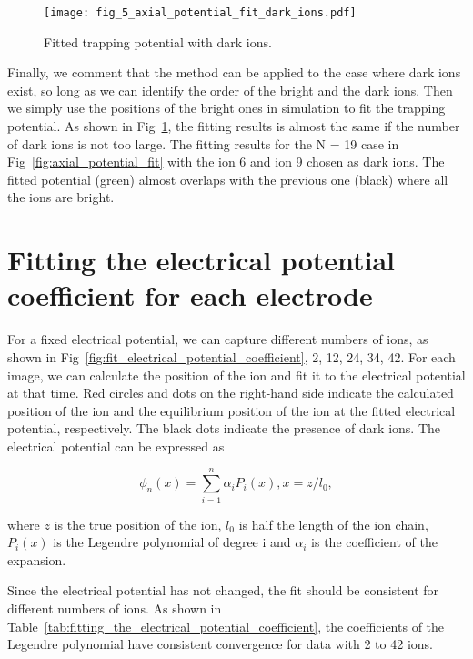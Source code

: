 \begin{figure}
    \centering
    \texttt{[image: fig\_5\_axial\_potential\_fit\_dark\_ions.pdf]}
    \caption{Fitted trapping potential with dark ions.}
    \label{fig:axial_potential_fit_dark_ions}
\end{figure}

Finally, we comment that the method can be applied to the case where dark ions exist, so long as we can identify the order of the bright and the dark ions. Then we simply use the positions of the bright ones in simulation to fit the trapping potential. As shown in Fig~\ref{fig:axial_potential_fit_dark_ions}, the fitting results is almost the same if the number of dark ions is not too large. The fitting results for the N = 19 case in Fig~\ref{fig:axial_potential_fit} with the ion 6 and ion 9 chosen as dark ions. The fitted potential (green) almost overlaps with the previous one (black) where
all the ions are bright.



\section{Fitting the electrical potential coefficient for each electrode}

For a fixed electrical potential, we can capture different numbers of ions, as shown in Fig~\ref{fig:fit_electrical_potential_coefficient}, 2, 12, 24, 34, 42. For each image, we can calculate the position of the ion and fit it to the electrical potential at that time. Red circles and dots on the right-hand side indicate the calculated position of the ion and the equilibrium position of the ion at the fitted electrical potential, respectively. The black dots indicate the presence of dark ions. The electrical potential can be expressed as

\begin{equation}
    \phi_n(x)=\sum_{i=1}^n \alpha_i P_i(x), x=z / l_0,
\end{equation}

where $z$ is the true position of the ion, $l_0$ is half the length of the ion chain, $P_i(x)$ is the Legendre polynomial of degree i and $\alpha_i$ is the coefficient of the expansion.

Since the electrical potential has not changed, the fit should be consistent for different numbers of ions. As shown in Table~\ref{tab:fitting_the_electrical_potential_coefficient}, the coefficients of the Legendre polynomial have consistent convergence for data with 2 to 42 ions.

